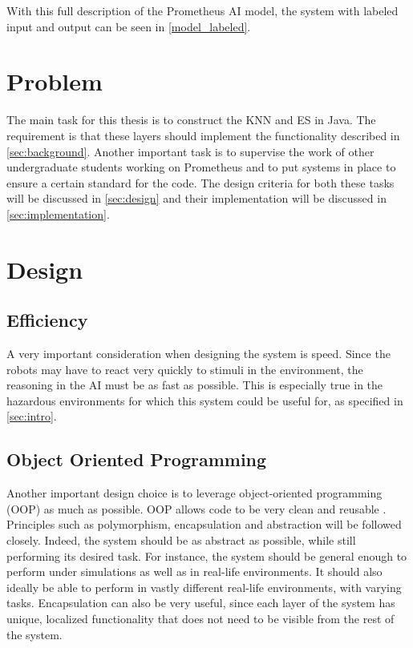 \documentclass[titlepage,11pt]{article}
\begin{document}
With this full description of the Prometheus AI model, the system with labeled input and output can be seen in \autoref{model_labeled}.

\section{Problem}
\label{sec:problem}

The main task for this thesis is to construct the KNN and ES in Java. The requirement is that these layers should implement the functionality described in \autoref{sec:background}. Another important task is to supervise the work of other undergraduate students working on Prometheus and to put systems in place to ensure a certain standard for the code. The design criteria for both these tasks will be discussed in \autoref{sec:design} and their implementation will be discussed in \cref{sec:implementation}.

\section{Design}
\label{sec:design}

\subsection{Efficiency}
A very important consideration when designing the system is speed. Since the robots may have to react very quickly to stimuli in the environment, the reasoning in the AI must be as fast as possible. This is especially true in the hazardous environments for which this system could be useful for, as specified in \autoref{sec:intro}.

\subsection{Object Oriented Programming}
Another important design choice is to leverage object-oriented programming (OOP) as much as possible. OOP allows code to be very clean and reusable \cite{oop}. Principles such as polymorphism, encapsulation and abstraction will be followed closely. Indeed, the system should be as abstract as possible, while still performing its desired task. For instance, the system should be general enough to perform under simulations as well as in real-life environments. It should also ideally be able to perform in vastly different real-life environments, with varying tasks. Encapsulation can also be very useful, since each layer of the system has unique, localized functionality that does not need to be visible from the rest of the system.
\end{document}
